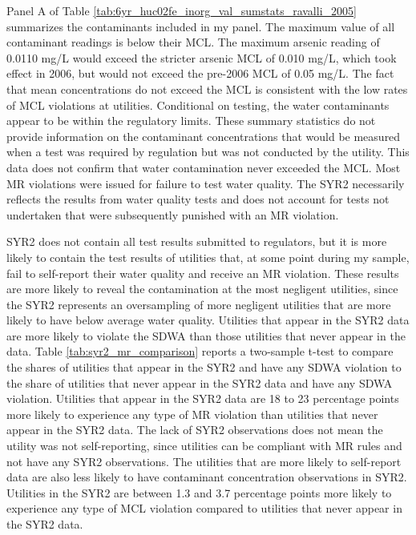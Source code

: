 \documentclass[12pt]{article}
\begin{document}
Panel A of Table \ref{tab:6yr_huc02fe_inorg_val_sumstats_ravalli_2005} summarizes the contaminants included in my panel. The maximum value of all contaminant readings is below their MCL. The maximum arsenic reading of 0.0110 mg/L would exceed the stricter arsenic MCL of 0.010 mg/L, which took effect in 2006, but would not exceed the pre-2006 MCL of 0.05 mg/L. The fact that mean concentrations do not exceed the MCL is consistent with the low rates of MCL violations at utilities. Conditional on testing, the water contaminants appear to be within the regulatory limits. These summary statistics do not provide information on the contaminant concentrations that would be measured when a test was required by regulation but was not conducted by the utility. This data does not confirm that water contamination never exceeded the MCL. Most MR violations were issued for failure to test water quality. The SYR2 necessarily reflects the results from water quality tests and does not account for tests not undertaken that were subsequently punished with an MR violation. 

SYR2 does not contain all test results submitted to regulators, but it is more likely to contain the test results of utilities that, at some point during my sample, fail to self-report their water quality and receive an MR violation. These results are more likely to reveal the contamination at the most negligent utilities, since the SYR2 represents an oversampling of more negligent utilities that are more likely to have below average water quality. Utilities that appear in the SYR2 data are more likely to violate the SDWA than those utilities that never appear in the data. Table \ref{tab:syr2_mr_comparison} reports a two-sample t-test to compare the shares of utilities that appear in the SYR2 and have any SDWA violation to the share of utilities that never appear in the SYR2 data and have any SDWA violation. Utilities that appear in the SYR2 data are 18 to 23 percentage points more likely to experience any type of MR violation than utilities that never appear in the SYR2 data. The lack of SYR2 observations does not mean the utility was not self-reporting, since utilities can be compliant with MR rules and not have any SYR2 observations. The utilities that are more likely to self-report data are also less likely to have contaminant concentration observations in SYR2. Utilities in the SYR2 are between 1.3 and 3.7 percentage points more likely to experience any type of MCL violation compared to utilities that never appear in the SYR2 data.
\end{document}
